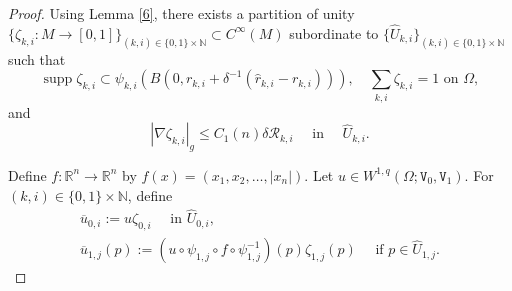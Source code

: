 \documentclass[reqno, 11pt, a4paper]{amsart}
\numberwithin{equation}{section}
\newcommand{\ck}{\textnormal K}
\newcommand{\spt}{\operatorname{supp}}
\newcommand{\wghtv}{\mathtt{V}}
\newcommand{\kp}{\mathscr{R}}
\newcommand{\pvr}{p}
\newcommand{\qxp}{q}
\begin{document}
\begin{proof}

Using Lemma \ref{6}, there exists a partition of unity $\{\zeta _{k,i} : M \rightarrow [0,1]\} _{(k,i) \in \{0,1\} \times \mathbb{N}} \subset C^{\infty}(M)$   subordinate to $\{ \hat{U}_{k,i} \}_{ (k,i) \in \{0,1\} \times \mathbb{N} }$ such that  
$$
\spt \zeta _{k,i} \subset \psi _{k,i} \left( B\left(0 ,  r _{k,i} + \delta ^{-1}(\hat r _{k,i} -r _{k,i} ) \right) \right),    \quad \sum_{k,i} \zeta _{k,i}=1 \text { on }\Omega,
$$ 
and 
$$ 
|\nabla \zeta _{k,i} |_g \leq  C_1(n) \delta \kp _{k , i} \quad \text {  in } \quad \hat U _{k,i}.
$$



  



Define $f:\mathbb R^n\rightarrow\mathbb R^n$ by $f(x)=(x_1,x_2,\ldots,|x_n|)$. Let $u\in W^{1,\qxp}(\Omega;\wghtv_0,\wghtv_1)$. For $(k,i)\in\{0,1\}\times\mathbb N$, define
\begin{gather*}
\overline u_{0,i}:=u\zeta_{0,i}\quad\text { in }\hat U_{0,i},\\[3pt]
\overline u_{1,j}(\pvr):=\left(u\circ\psi_{1,j}\circ f\circ\psi_{1,j}^{-1}\right)(\pvr)\zeta_{1,j}(\pvr)
\quad\text { if }\pvr\in\hat U_{1,j}.
\end{gather*}


\end{proof}
\end{document}
